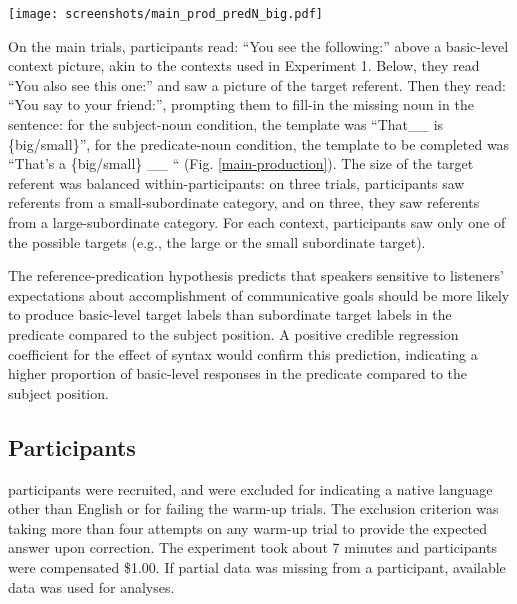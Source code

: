 \begin{figure*}[t]
	\begin{center}
		\texttt{[image: screenshots/main\_prod\_predN\_big.pdf]}
	\end{center}
    \vspace{-0.5cm}
	\caption{Example view of the noun production main trial: Participants fill-in the noun in the predicate position of a sentence describing a large-subordinate target in basic-level dogs context.}
	\label{main-production}
\end{figure*}
On the main trials, participants read: “You see the following:” above a basic-level context picture, akin to the contexts used in Experiment 1. Below, they read “You also see this one:” and saw a picture of the target referent. Then they read: “You say to your friend:”, prompting them to fill-in the missing noun in the sentence: for the subject-noun condition, the template was “That\_\_ is \{big/small\}”, for the predicate-noun condition, the template to be completed was “That’s a \{big/small\} \_\_ “ (Fig. \ref{main-production}).  
The size of the target referent was balanced within-participants: on three trials, participants saw referents from a small-subordinate category, and on three, they saw referents from a large-subordinate category. For each context, participants saw only one of the possible targets (e.g., the large or the small subordinate target).

The reference-predication hypothesis predicts that speakers sensitive to listeners' expectations about accomplishment of communicative goals should be more likely to produce basic-level target labels than subordinate target labels in the predicate compared to the subject position. A positive credible regression coefficient for the effect of syntax would confirm this prediction, indicating a higher proportion of basic-level responses in the predicate compared to the subject position. 

\subsection{Participants}
  participants were recruited, and   were excluded for indicating a native language other than English or for failing the warm-up trials. The exclusion criterion was taking more than four attempts on any warm-up trial to provide the expected answer upon correction. The experiment took about 7 minutes and participants were compensated \$1.00. If partial data was missing from a participant, available data was used for analyses. 
 
